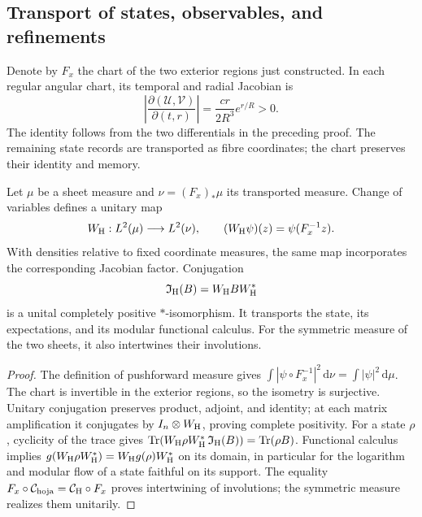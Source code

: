 \subsection{Transport of states, observables, and refinements}
\label{vii:subsec:transporte-informacion-horizonte}

Denote by \(F_x\) the chart of the two exterior regions just constructed.
In each regular angular chart, its temporal and radial Jacobian is
\begin{equation}
 \left|\frac{\partial(\mathcal U,\mathcal V)}{\partial(t,r)}\right|
 =\frac{cr}{2R^3}e^{r/R}>0.
 \label{vii:eq:jacobiano-kruskal}
\end{equation}
The identity follows from the two differentials in the preceding proof.
The remaining state records are transported as fibre coordinates;
the chart preserves their identity and memory.

\begin{proposition}
\label{vii:prop:transporte-unitario-horizonte}
Let \(\mu\) be a sheet measure and \(\nu=(F_x)_*\mu\) its
transported measure. Change of variables defines a unitary map
\begin{equation}
 W_{\rm H}:L^2(\mu)\longrightarrow L^2(\nu),\qquad
 (W_{\rm H}\psi)(z)=\psi(F_x^{-1}z).
 \label{vii:eq:unitaria-horizonte}
\end{equation}
With densities relative to fixed coordinate measures, the same
map incorporates the corresponding Jacobian factor.
Conjugation
\begin{equation}
 \mathfrak I_{\rm H}(B)=W_{\rm H}BW_{\rm H}^*
 \label{vii:eq:mapa-observables-horizonte}
\end{equation}
is a unital completely positive \(*\)-isomorphism. It transports the
state, its expectations, and its modular functional calculus. For the
symmetric measure of the two sheets, it also intertwines their involutions.
\end{proposition}
\begin{proof}
The definition of pushforward measure gives
\(\int|\psi\circ F_x^{-1}|^2\,\mathrm d\nu
=\int|\psi|^2\,\mathrm d\mu\).
The chart is invertible in the exterior regions, so the isometry is
surjective. Unitary conjugation preserves product, adjoint, and
identity; at each matrix amplification it conjugates by
\(I_n\otimes W_{\rm H}\), proving complete positivity.
For a state \(\rho\), cyclicity of the trace gives
\(\operatorname{Tr}(W_{\rm H}\rho W_{\rm H}^*
\,\mathfrak I_{\rm H}(B))=\operatorname{Tr}(\rho B)\).
Functional calculus implies
\(g(W_{\rm H}\rho W_{\rm H}^*)=W_{\rm H}g(\rho)W_{\rm H}^*\)
on its domain, in particular for the logarithm and modular flow of
a state faithful on its support. The equality
\(F_x\circ\mathcal C_{\rm hoja}=\mathcal C_{\rm H}\circ F_x\)
proves intertwining of involutions; the symmetric measure realizes them
unitarily.
\end{proof}

